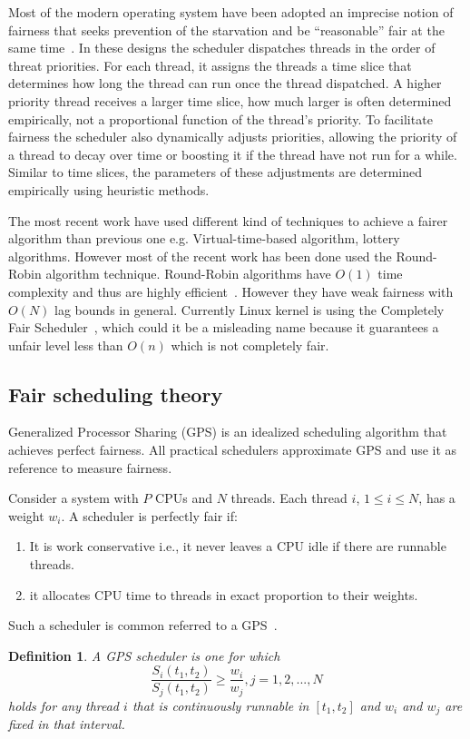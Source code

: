 Most of the modern operating system have been adopted an imprecise notion of fairness that seeks prevention of the starvation and be ``reasonable'' fair at the same time~\cite{li09}. In these designs the scheduler dispatches threads in the order of threat priorities. For each thread, it assigns the threads a time slice that determines how long the thread can run once the thread dispatched. A higher priority thread receives a larger time slice, how much larger is often determined empirically, not a proportional function of the thread's priority. To facilitate fairness the scheduler also dynamically adjusts priorities, allowing the priority of a thread to decay over time or boosting it if the thread have not run for a while. Similar to time slices, the parameters of these adjustments are determined empirically using heuristic methods. 

The most recent work have used different kind of techniques to achieve a fairer algorithm than previous one e.g. Virtual-time-based algorithm, lottery algorithms. However most of the recent work has been done used the Round-Robin algorithm technique. Round-Robin algorithms have $O(1)$ time complexity and thus are highly efficient~\cite{li09}. However they have weak fairness with $O(N)$ lag bounds in general. Currently Linux kernel is using the Completely Fair Scheduler~\cite{jones09}, which could it be a misleading name because it guarantees a unfair level less than $O(n)$ which is not completely fair. 

\subsection{Fair scheduling theory}
Generalized Processor Sharing (GPS) is an idealized scheduling algorithm that achieves perfect fairness. All practical schedulers approximate GPS and use it as reference to measure fairness.

Consider a system with $P$ CPUs and $N$ threads. Each thread $i$, $1 \leq i \leq N$, has a weight $w_i$. A scheduler is perfectly fair if:
\begin{enumerate}
	\item It is work conservative i.e., it never leaves a CPU idle if there are runnable threads.
	\item it allocates CPU time to threads in exact proportion to their weights.
\end{enumerate}
Such a scheduler is common referred to a GPS~\cite{parekh93}.

\newtheorem{gps-model}{Definition}
\begin{gps-model}
A GPS scheduler is one for which
$$\frac{S_i(t_1, t_2)}{S_j(t_1, t_2)} \geq \frac{w_i}{w_j}, j=1, 2, ..., N$$
holds for any thread $i$ that is continuously runnable in $[t_1, t_2]$ and $w_i$ and $w_j$ are fixed in that interval. 
\end{gps-model}

